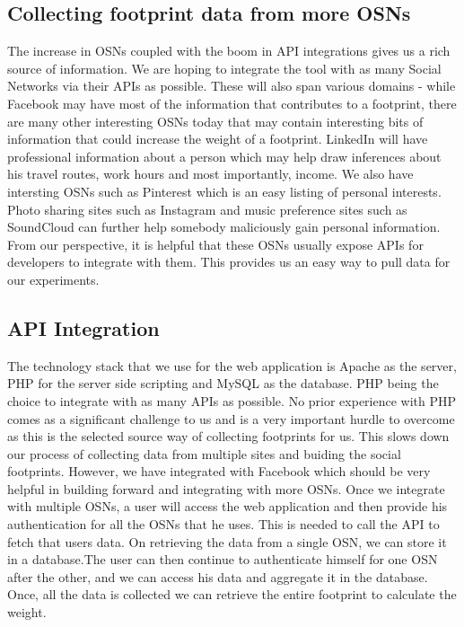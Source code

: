 \documentclass[conference]{IEEEtran}
\begin{document}
\subsection{Collecting footprint data from more OSNs}
The increase in OSNs coupled with the boom in API integrations gives us a rich source of information. We are hoping to integrate the tool with as many Social Networks via their APIs as possible. These will also span various domains - while Facebook may have most of the information that contributes to a footprint, there are many other interesting OSNs today that may contain interesting bits of information that could increase the weight of a footprint. LinkedIn will have professional information about a person which may help draw inferences about his travel routes, work hours and most importantly, income. We also have intersting OSNs such as Pinterest which is an easy listing of personal interests. Photo sharing sites such as Instagram and music preference sites such as SoundCloud can further help somebody maliciously gain personal information. From our perspective, it is helpful that these OSNs usually expose APIs for developers to integrate with them. This provides us an easy way to pull data for our experiments.
\subsection{API Integration}
The technology stack that we use for the web application is Apache as the server, PHP for the server side scripting and MySQL as the database. PHP being the choice to integrate with as many APIs as possible. No prior experience with PHP comes as a significant challenge to us and is a very important hurdle to overcome as this is the selected source way of collecting footprints for us. This slows down our process of collecting data from multiple sites and buiding the social footprints. However, we have integrated with Facebook which should be very helpful in building forward and integrating with more OSNs. Once we integrate with multiple OSNs, a user will access the web application and then provide his authentication for all the OSNs that he uses. This is needed to call the API to fetch that users data. On retrieving the data from a single OSN, we can store it in a database.The user can then continue to authenticate himself for one OSN after the other, and we can access his data and aggregate it in the database. Once, all the data is collected we can retrieve the entire footprint to calculate the weight.
\end{document}

